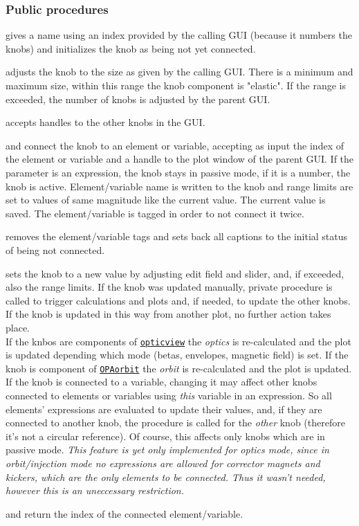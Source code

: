 \documentclass[12pt]{article}
\newcommand\code[1]{{\tt #1}}
\newcommand\guifco[1]{{\color{violet}\code{#1}}}
\newcommand{\opagui}[1]{\colorbox{blue!20}{\code{#1}}}
\newcommand{\ogui}[1]{\hyperref[#1]{\opagui{#1}}}
\newcommand{\ppro}[1]{\subsubsection*{Public procedures} #1}
\newcommand{\todo}[1]{{\color{red}\em #1}}
\begin{document}
\ppro{
\guifco{Init} gives a name using an index provided by the calling GUI (because it numbers the knobs) and initializes the knob as being not yet connected.

\guifco{SetSize} adjusts the knob to the size as given by the calling GUI. There is a minimum and maximum size, within this range the knob component is "elastic". If the range is exceeded, the number of knobs is adjusted by the parent GUI.

\guifco{Brotherhandles} accepts handles to the other knobs in the GUI.

\guifco{Load} and \guifco{LoadVar} connect the knob to an element or variable, accepting as input the index of the element or variable and a handle to the plot window of the parent GUI. If the parameter is an expression, the knob stays in passive mode, if it is a number, the knob is active. Element/variable name is written to the knob and range limits are set to values of same magnitude like the current value. The current value is saved. The element/variable is tagged in order to not connect it twice.

\guifco{UnLoad} removes the element/variable tags and sets back all captions to the initial status of being not connected.

\guifco{KUpdate} sets the knob to a new value by adjusting edit field and slider, and, if exceeded, also the range limits. If the knob was updated manually, private procedure \guifco{Action} is called to trigger calculations and plots and, if needed, to update the other knobs. If the knob is updated in this way from another plot, no further action takes place.\\
If the knbos are components of \ogui{opticview} the {\em optics} is re-calculated and the plot is updated depending which mode (betas, envelopes, magnetic field) is set.
If the knob is component of \ogui{OPAorbit} the {\em orbit} is re-calculated and the plot is updated.\\
If the knob is connected to a variable, changing it may affect other knobs connected to elements or variables using {\em this} variable in an expression. So all elements' expressions are evaluated to update their values, and, if they are connected to another knob, the \guifco{KUpdate} procedure is called for the {\em other} knob (therefore it's not a circular reference). Of course, this affects only knobs which are in passive mode. \todo{This feature is yet only implemented for optics mode, since in orbit/injection mode no expressions are allowed for corrector magnets and kickers, which are the only elements to be connected. Thus it wasn't needed, however this is an uneccessary restriction.}

\guifco{getella} and \guifco{getvar} return the index of the connected element/variable.
}
\end{document}
